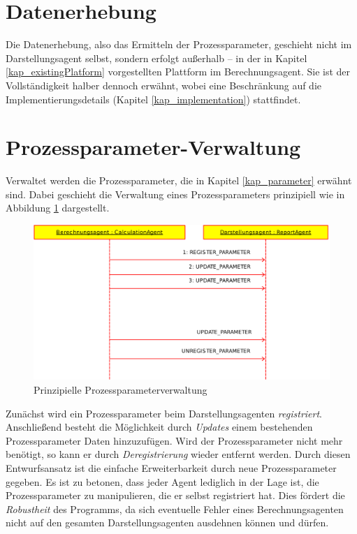 \documentclass[a4paper,12pt,oneside,openright,onecolumn,final,titlepage,fleqn,ngerman]{scrreprt}
\newcommand{\calcag}{Berechnungsagent}
\newcommand{\repag}{Darstellungsagent}
\begin{document}
	\section{Datenerhebung}
	Die Datenerhebung, also das Ermitteln der Prozessparameter, geschieht nicht im \repag{} selbst, sondern erfolgt außerhalb -- in der in Kapitel \ref{kap_existingPlatform} vorgestellten Plattform im \calcag{}. Sie ist der Vollständigkeit halber dennoch erwähnt, wobei eine Beschränkung auf die Implementierungsdetails (Kapitel \ref{kap_implementation}) stattfindet.
	
	\section{Prozessparameter-Verwaltung}\label{kap_entw_parver}
	Verwaltet werden die Prozessparameter, die in Kapitel \ref{kap_parameter} erwähnt sind. Dabei geschieht die Verwaltung eines Prozessparameters prinzipiell wie in Abbildung \ref{seq_parver} dargestellt.
	\begin{figure}[ht]
		\centering
		\includegraphics[keepaspectratio=true,width=\textwidth]{res/Sequenzdiagramm_Parameterverwaltung.png}
		\caption{Prinzipielle Prozessparameterverwaltung}
		\label{seq_parver}
	\end{figure}
	Zunächst wird ein Prozessparameter beim \repag{}en \emph{registriert}. Anschließend besteht die Möglichkeit durch \emph{Updates} einem bestehenden Prozessparameter Daten hinzuzufügen. Wird der Prozessparameter nicht mehr benötigt, so kann er durch \emph{Deregistrierung} wieder entfernt werden. Durch diesen Entwurfsansatz ist die einfache Erweiterbarkeit durch neue Prozessparameter gegeben. Es ist zu betonen, dass jeder Agent lediglich in der Lage ist, die Prozessparameter zu manipulieren, die er selbst registriert hat. Dies fördert die \emph{Robustheit} des Programms, da sich eventuelle Fehler eines \calcag{}en nicht auf den gesamten \repag{}en ausdehnen können und dürfen.
	
\end{document}
